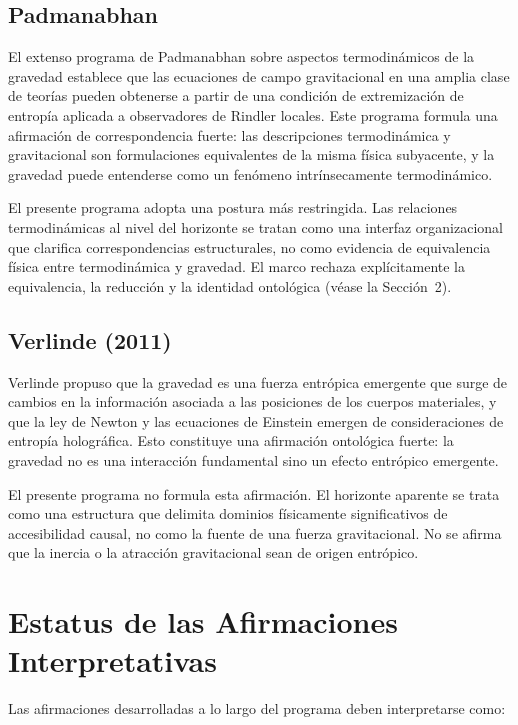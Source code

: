 \documentclass[12pt,a4paper]{article}
\begin{document}
\subsection*{Padmanabhan}

El extenso programa de Padmanabhan sobre aspectos termodinámicos de la gravedad establece que las ecuaciones de campo gravitacional en una amplia clase de teorías pueden obtenerse a partir de una condición de extremización de entropía aplicada a observadores de Rindler locales. Este programa formula una afirmación de correspondencia fuerte: las descripciones termodinámica y gravitacional son formulaciones equivalentes de la misma física subyacente, y la gravedad puede entenderse como un fenómeno intrínsecamente termodinámico.

El presente programa adopta una postura más restringida. Las relaciones termodinámicas al nivel del horizonte se tratan como una interfaz organizacional que clarifica correspondencias estructurales, no como evidencia de equivalencia física entre termodinámica y gravedad. El marco rechaza explícitamente la equivalencia, la reducción y la identidad ontológica (véase la Sección~2).

\subsection*{Verlinde (2011)}

Verlinde propuso que la gravedad es una fuerza entrópica emergente que surge de cambios en la información asociada a las posiciones de los cuerpos materiales, y que la ley de Newton y las ecuaciones de Einstein emergen de consideraciones de entropía holográfica. Esto constituye una afirmación ontológica fuerte: la gravedad no es una interacción fundamental sino un efecto entrópico emergente.

El presente programa no formula esta afirmación. El horizonte aparente se trata como una estructura que delimita dominios físicamente significativos de accesibilidad causal, no como la fuente de una fuerza gravitacional. No se afirma que la inercia o la atracción gravitacional sean de origen entrópico.

\section{Estatus de las Afirmaciones Interpretativas}

Las afirmaciones desarrolladas a lo largo del programa deben interpretarse como:
\end{document}
